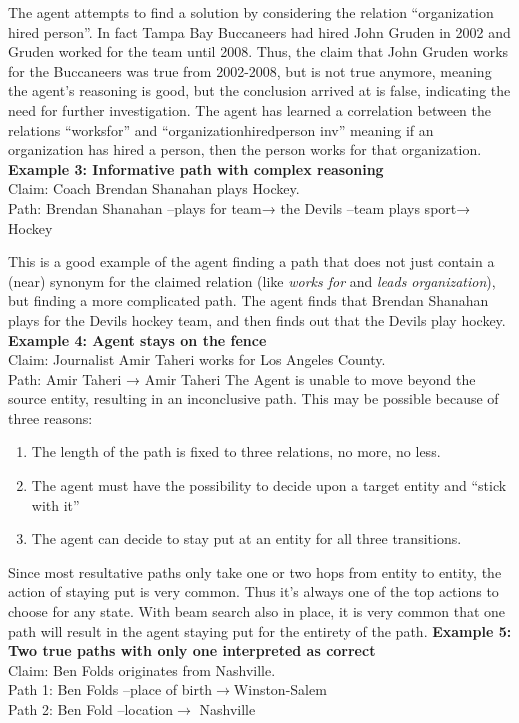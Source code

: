 \noindent The agent attempts to find a solution by considering the relation “organization hired person”.
In fact Tampa Bay Buccaneers had hired John Gruden in 2002 and Gruden worked for the team until 2008.
Thus, the claim that John Gruden works for the Buccaneers was true from 2002-2008, but is not true anymore, meaning  the agent's reasoning is good, but the conclusion arrived at is false, indicating the need for further investigation.
The agent has learned a correlation between the relations “worksfor” and “organizationhiredperson inv” meaning if an organization has hired a person, then the person works for that organization.
\newline
\textbf{Example 3: Informative path with complex reasoning}
\\Claim:	Coach Brendan Shanahan plays Hockey.
\\Path:	Brendan Shanahan –plays for team→ the Devils –team plays sport→ Hockey

\noindent This is a good example of the agent finding a path that does not just contain a (near) synonym for the claimed relation (like \textit{works for} and \textit{leads organization}), but finding a more complicated path.
The agent finds that Brendan Shanahan plays for the Devils hockey team, and then finds out that the Devils play hockey.
\newline
\noindent\textbf{Example 4: Agent stays on the fence}
\\Claim:	Journalist Amir Taheri works for Los Angeles County.
\\Path:	Amir Taheri → Amir Taheri 
\newline
The Agent is unable to move beyond the source entity, resulting in an inconclusive path. This may be possible because of three reasons:
\begin{enumerate}
    \item The length of the path is fixed to three relations, no more, no less.
    \item The agent must have the possibility to decide upon a target entity and “stick with it”
    \item The agent can decide to stay put at an entity for all three transitions.
\end{enumerate}
Since most resultative paths only take one or two hops from entity to entity, the action of staying put is very common. Thus it’s always one of the top actions to choose for any state. With beam search also in place, it is very common that one path will result in the agent staying put for the entirety of the path.
\newline
\textbf{Example 5: Two true paths with only one interpreted as correct}
\\Claim: Ben Folds originates from Nashville.
\\Path 1: Ben Folds --place of birth$\rightarrow$Winston-Salem
\\Path 2: Ben Fold --location$\rightarrow$ Nashville

